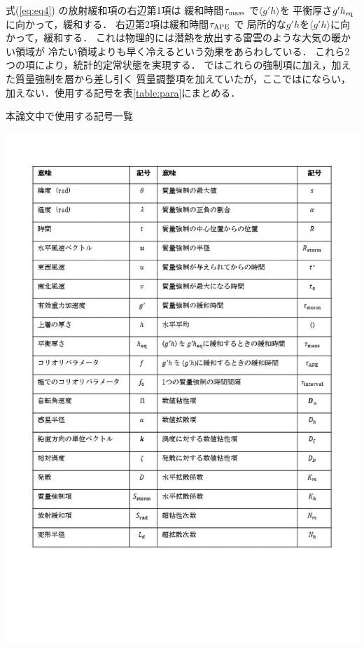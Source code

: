 \documentclass[a4j,12pt,openbib,oneside]{jreport}
\begin{document}
式(\ref{eq:eq4}) の放射緩和項の右辺第1項は
緩和時間$\tau_{{\rm{mass}}}$ で$\langle g'h \rangle $を
平衡厚さ$g'h_{{\rm{eq}}}$に向かって，緩和する．
%
右辺第2項は緩和時間$\tau_{{\rm{APE}}}$ で
局所的な$g'h$を$\langle g'h \rangle $に向かって，緩和する．
%
これは物理的には潜熱を放出する雷雲のような大気の暖かい領域が
冷たい領域よりも早く冷えるという効果をあらわしている．
%
これら2つの項により，統計的定常状態を実現する．
%
\cite{Brueshaber2019} ではこれらの強制項に加え，加えた質量強制を層から差し引く
質量調整項を加えていたが，ここでは\cite{Showman2007}にならい，加えない．使用する記号を表\ref{table:para}にまとめる．
\begin{table}[t]
  \caption{本論文中で使用する記号一覧}
  \label{table:para}
  \begin{center}
    \includegraphics[clip,width=15cm]{./fig/model/table_para-2.jpg}
  \end{center}
\end{table}
%
\clearpage
\newpage
\end{document}

